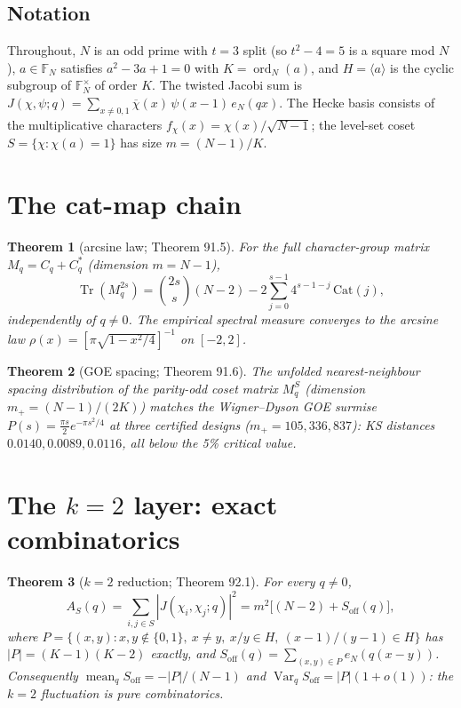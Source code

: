 \documentclass[11pt]{article}
\newtheorem{theorem}{Theorem}[section]
\begin{document}
\subsection{Notation}

Throughout, $N$ is an odd prime with $t = 3$ split (so
$t^2 - 4 = 5$ is a square mod $N$), $a \in \mathbb{F}_N$ satisfies
$a^2 - 3a + 1 = 0$ with $K = \operatorname{ord}_N(a)$, and
$H = \langle a\rangle$ is the cyclic subgroup of $\mathbb{F}_N^\times$
of order $K$.  The twisted Jacobi sum is
$J(\chi,\psi;q) = \sum_{x \neq 0,1} \overline{\chi}(x)\,
\psi(x{-}1)\,e_N(qx)$.
The Hecke basis consists of the multiplicative characters
$f_\chi(x) = \chi(x)/\sqrt{N-1}$; the level-set coset
$S = \{\chi : \chi(a) = 1\}$ has size $m = (N{-}1)/K$.

\section{The cat-map chain}
\label{sec:catmap2}\label{sec:catmap}

\begin{theorem}[arcsine law; Theorem 91.5]
\label{thm:arcsine}
For the full character-group matrix $M_q = C_q + C_q^*$ (dimension
$m = N{-}1$),
\[
  \operatorname{Tr}(M_q^{2s}) = \binom{2s}{s}(N{-}2)
  - 2\sum_{j=0}^{s-1} 4^{s-1-j}\,\mathrm{Cat}(j),
\]
independently of $q \neq 0$.  The empirical spectral measure converges
to the arcsine law $\rho(x) = [\pi\sqrt{1 - x^2/4}]^{-1}$ on $[-2,2]$.
\end{theorem}

\begin{theorem}[GOE spacing; Theorem 91.6]
\label{thm:goe}
The unfolded nearest-neighbour spacing distribution of the parity-odd
coset matrix $M_q^S$ (dimension $m_+ = (N{-}1)/(2K)$) matches the
Wigner--Dyson GOE surmise $P(s) = \tfrac{\pi s}{2}e^{-\pi s^2/4}$ at
three certified designs ($m_+ = 105, 336, 837$): KS distances
$0.0140, 0.0089, 0.0116$, all below the 5\% critical value.
\end{theorem}

\section{The \texorpdfstring{$k=2$}{k=2} layer: exact combinatorics}\label{sec:package}

\begin{theorem}[$k=2$ reduction; Theorem 92.1]
\label{thm:k2}
For every $q \neq 0$,
\[
  A_S(q) = \sum_{i,j \in S}|J(\chi_i,\chi_j;q)|^2
         = m^2\big[(N{-}2) + S_{\mathrm{off}}(q)\big],
\]
where $P = \{(x,y): x,y \notin \{0,1\},\ x \neq y,\ x/y \in H,\
(x{-}1)/(y{-}1) \in H\}$ has $|P| = (K{-}1)(K{-}2)$ exactly, and
$S_{\mathrm{off}}(q) = \sum_{(x,y) \in P} e_N(q(x{-}y))$.
Consequently $\operatorname{mean}_q S_{\mathrm{off}} = -|P|/(N{-}1)$
and $\operatorname{Var}_q S_{\mathrm{off}} = |P|(1 + o(1))$: the
$k{=}2$ fluctuation is pure combinatorics.
\end{theorem}
\end{document}
